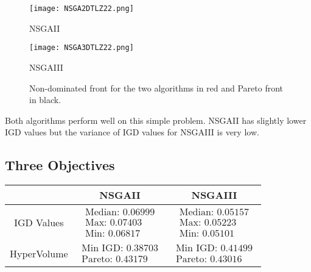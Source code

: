 \documentclass[a4paper,11pt]{article}
\numberwithin{equation}{section}
\begin{document}
\begin{figure}[h]
        \centering
        \begin{minipage}{0.48\textwidth} 
            \centering
            \texttt{[image: NSGA2DTLZ22.png]} 
            \caption*{NSGAII}
        \end{minipage}
        \hfill
        \begin{minipage}{0.48\textwidth} 
            \centering
            \texttt{[image: NSGA3DTLZ22.png]} 
            \caption*{NSGAIII} 
        \end{minipage}
        \caption{Non-dominated front for the two algorithms in red and Pareto front in black. } 
    \end{figure}

\noindent Both algorithms perform well on this simple problem. NSGAII has slightly lower IGD values but the variance of IGD values for NSGAIII is very low. 

\newpage

\subsection{Three Objectives}

\begin{table}[!h]
\begin{center}
\begin{tabular}{|c|c|c|}
\hline
 & NSGAII & NSGAIII \\
\hline
IGD Values &$\begin{array}{l}
\text{Median: 0.06999}\\
\text{Max: 0.07403}\\
\text{Min: 0.06817}\end{array}$&
$\begin{array}{l}
\text{Median: 0.05157}\\
\text{Max: 0.05223}\\
\text{Min: 0.05101}\end{array}$\\
\hline
HyperVolume &$\begin{array}{l}
\text{Min IGD: 0.38703}\\
\text{Pareto: 0.43179}\end{array}$&
$\begin{array}{l}
\text{Min IGD: 0.41499}\\
\text{Pareto: 0.43016}\end{array}$\\
\hline
\end{tabular}
\end{center}
\end{table}
\end{document}
